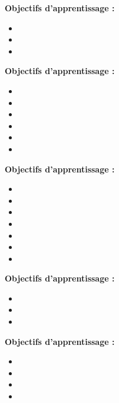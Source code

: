 \par\noindent\textbf{Objectifs d'apprentissage :}
\begin{itemize}
    \item \useobj[C4A2ea]
    \item \useobj[C4A2eb]
    \item \useobj[C4A2ec]
\end{itemize}
\endsequence

\par\noindent\textbf{Objectifs d'apprentissage :}
\begin{itemize}
    \item \useobj[C4C2ba]
    \item \useobj[C4C2bb]
    \item \useobj[C4C2bc]
    \item \useobj[C4C2bd]
    \item \useobj[C4C2be]
    \item \useobj[C4C2bf]
\end{itemize}
\endsequence

\par\noindent\textbf{Objectifs d'apprentissage :}
\begin{itemize}
    \item \useobj[C4C2aa]
    \item \useobj[C4C2ab]
    \item \useobj[C4C2ac]
    \item \useobj[C4C2ad]
    \item \useobj[C4C2ae]
    \item \useobj[C4C2af]
    \item \useobj[C4C2ag]
\end{itemize}
\endsequence

\par\noindent\textbf{Objectifs d'apprentissage :}
\begin{itemize}
    \item \useobj[C4B2ca]
    \item \useobj[C4B2cb]
    \item \useobj[C4B2cc]
\end{itemize}
\endsequence

\par\noindent\textbf{Objectifs d'apprentissage :}
\begin{itemize}
    \item \useobj[C4B2ea]
    \item \useobj[C4B2ed]
    \item \useobj[C4B2ee]
    \item \useobj[C4B2ef]
\end{itemize}
\endsequence

